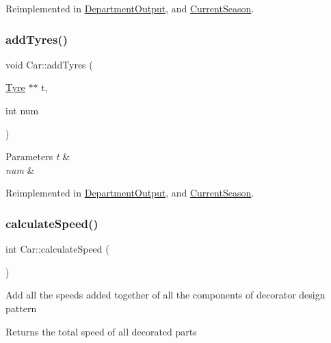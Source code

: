 Reimplemented in \hyperlink{classDepartmentOutput_a6ce74748aa402298902e378ff47c1e49}{Department\+Output}, and \hyperlink{classCurrentSeason_a2ae9598222bc7aba71040775c019f297}{Current\+Season}.

\mbox{\label{classCar_a5c5f22cb9232b88a53a4ffc324824aa1}} 
\subsubsection{\texorpdfstring{add\+Tyres()}{addTyres()}}
{\footnotesize\ttfamily void Car\+::add\+Tyres (\begin{DoxyParamCaption}\item[{\hyperlink{classTyre}{Tyre} $\ast$$\ast$}]{t,  }\item[{int}]{num }\end{DoxyParamCaption})\hspace{0.3cm}{\ttfamily [virtual]}}


\begin{DoxyParams}{Parameters}
{\em t} & \\
\hline
{\em num} & \\
\hline
\end{DoxyParams}


Reimplemented in \hyperlink{classDepartmentOutput_a7f231762cf94d1f18a2e7bb3290afbda}{Department\+Output}, and \hyperlink{classCurrentSeason_a62e6e6c10c5490084230d4c3722196e5}{Current\+Season}.

\mbox{\label{classCar_aadb72568edbdf571547ec48e9781237f}} 
\subsubsection{\texorpdfstring{calculate\+Speed()}{calculateSpeed()}}
{\footnotesize\ttfamily int Car\+::calculate\+Speed (\begin{DoxyParamCaption}{ }\end{DoxyParamCaption})\hspace{0.3cm}{\ttfamily [virtual]}}

Add all the speeds added together of all the components of decorator design pattern \begin{DoxyReturn}{Returns}
the total speed of all decorated parts 
\end{DoxyReturn}


